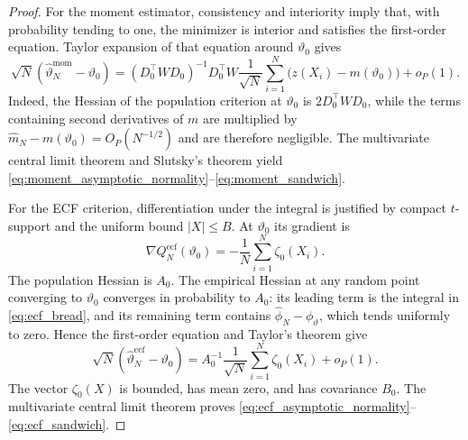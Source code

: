 \documentclass[11pt]{amsart}
\numberwithin{equation}{section}\setcounter{tocdepth}{3}\setcounter{secnumdepth}{3}
\begin{document}
\begin{proof}
For the moment estimator, consistency and interiority imply that, with probability tending
to one, the minimizer is interior and satisfies the first-order equation.  Taylor expansion
of that equation around $\vartheta_0$ gives
\begin{equation}
 \sqrt N(\widehat\vartheta_N^{\mathrm{mom}}-\vartheta_0)
 =(D_0^\top WD_0)^{-1}D_0^\top W
 \frac1{\sqrt N}\sum_{i=1}^N
 \bigl(z(X_i)-m(\vartheta_0)\bigr)+o_P(1).
 \label{eq:moment_linearization}
\end{equation}
Indeed, the Hessian of the population criterion at $\vartheta_0$ is
$2D_0^\top WD_0$, while the terms containing second derivatives of $m$ are multiplied by
$\widehat m_N-m(\vartheta_0)=O_P(N^{-1/2})$ and are therefore negligible.  The
multivariate central limit theorem and Slutsky's theorem yield
\eqref{eq:moment_asymptotic_normality}--\eqref{eq:moment_sandwich}.

For the ECF criterion, differentiation under the integral is justified by compact
$t$-support and the uniform bound $|X|\le B$.  At $\vartheta_0$ its gradient is
\begin{equation}
 \nabla Q_N^{\mathrm{ecf}}(\vartheta_0)
 =-\frac1N\sum_{i=1}^N\zeta_0(X_i).
 \label{eq:ecf_gradient_at_truth}
\end{equation}
The population Hessian is $A_0$.  The empirical Hessian at any random point converging
to $\vartheta_0$ converges in probability to $A_0$: its leading term is the integral in
\eqref{eq:ecf_bread}, and its remaining term contains
$\widehat\phi_N-\phi_\vartheta$, which tends uniformly to zero.  Hence the first-order
equation and Taylor's theorem give
\begin{equation}
 \sqrt N(\widehat\vartheta_N^{\mathrm{ecf}}-\vartheta_0)
 =A_0^{-1}\frac1{\sqrt N}\sum_{i=1}^N\zeta_0(X_i)+o_P(1).
 \label{eq:ecf_linearization}
\end{equation}
The vector $\zeta_0(X)$ is bounded, has mean zero, and has covariance $B_0$.
The multivariate central limit theorem proves
\eqref{eq:ecf_asymptotic_normality}--\eqref{eq:ecf_sandwich}.
\end{proof}
\end{document}
